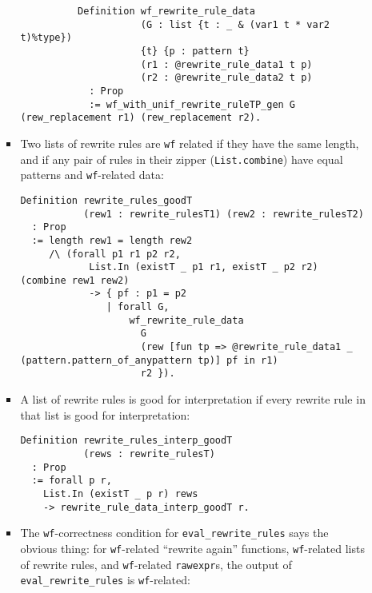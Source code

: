 \begin{itemize}
\begin{itemize}
\begin{itemize}
\begin{verbatim}
          Definition wf_rewrite_rule_data
                     (G : list {t : _ & (var1 t * var2 t)%type})
                     {t} {p : pattern t}
                     (r1 : @rewrite_rule_data1 t p)
                     (r2 : @rewrite_rule_data2 t p)
            : Prop
            := wf_with_unif_rewrite_ruleTP_gen G (rew_replacement r1) (rew_replacement r2).
\end{verbatim}
    \item
      Two lists of rewrite rules are \texttt{wf} related if they have
      the same length, and if any pair of rules in their zipper
      (\texttt{List.combine}) have equal patterns and
      \texttt{wf}-related data:

\begin{verbatim}
Definition rewrite_rules_goodT
           (rew1 : rewrite_rulesT1) (rew2 : rewrite_rulesT2)
  : Prop
  := length rew1 = length rew2
     /\ (forall p1 r1 p2 r2,
            List.In (existT _ p1 r1, existT _ p2 r2) (combine rew1 rew2)
            -> { pf : p1 = p2
               | forall G,
                   wf_rewrite_rule_data
                     G
                     (rew [fun tp => @rewrite_rule_data1 _ (pattern.pattern_of_anypattern tp)] pf in r1)
                     r2 }).
\end{verbatim}
    \item
      A list of rewrite rules is good for interpretation if every
      rewrite rule in that list is good for interpretation:

\begin{verbatim}
Definition rewrite_rules_interp_goodT
           (rews : rewrite_rulesT)
  : Prop
  := forall p r,
    List.In (existT _ p r) rews
    -> rewrite_rule_data_interp_goodT r.
\end{verbatim}
    \item
      The \texttt{wf}-correctness condition for
      \texttt{eval\_rewrite\_rules} says the obvious thing: for
      \texttt{wf}-related ``rewrite again'' functions,
      \texttt{wf}-related lists of rewrite rules, and
      \texttt{wf}-related \texttt{rawexpr}s, the output of
      \texttt{eval\_rewrite\_rules} is \texttt{wf}-related:


\end{itemize}
\end{itemize}
\end{itemize}
